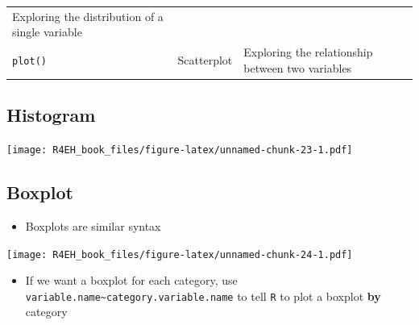 \documentclass[]{book}
\newenvironment{Shaded}{\begin{snugshade}}{\end{snugshade}}
\newcommand{\KeywordTok}[1]{\textcolor[rgb]{0.13,0.29,0.53}{\textbf{#1}}}
\newcommand{\StringTok}[1]{\textcolor[rgb]{0.31,0.60,0.02}{#1}}
\newcommand{\OperatorTok}[1]{\textcolor[rgb]{0.81,0.36,0.00}{\textbf{#1}}}
\newcommand{\NormalTok}[1]{#1}
\providecommand{\tightlist}{%
  \setlength{\itemsep}{0pt}\setlength{\parskip}{0pt}}
\theoremstyle{definition}
\theoremstyle{definition}
\theoremstyle{definition}
\theoremstyle{remark}
\begin{document}
\begin{longtable}[]{@{}lll@{}}
\begin{minipage}[t]{0.63\columnwidth}
Exploring the distribution of a single variable\strut
\end{minipage}\tabularnewline
\begin{minipage}[t]{0.14\columnwidth}\raggedright\strut
\texttt{plot()}\strut
\end{minipage} & \begin{minipage}[t]{0.14\columnwidth}\raggedright\strut
Scatterplot\strut
\end{minipage} & \begin{minipage}[t]{0.63\columnwidth}\raggedright\strut
Exploring the relationship between two variables\strut
\end{minipage}\tabularnewline
\bottomrule
\end{longtable}

\subsection{Histogram}\label{histogram}

\begin{Shaded}
\end{Shaded}

\texttt{[image: R4EH\_book\_files/figure-latex/unnamed-chunk-23-1.pdf]}

\subsection{Boxplot}\label{boxplot}

\begin{itemize}
\tightlist
\item
  Boxplots are similar syntax
\end{itemize}

\begin{Shaded}
\end{Shaded}

\texttt{[image: R4EH\_book\_files/figure-latex/unnamed-chunk-24-1.pdf]}

\begin{itemize}
\tightlist
\item
  If we want a boxplot for each category, use
  \texttt{variable.name\textasciitilde{}category.variable.name} to tell
  \texttt{R} to plot a boxplot \textbf{by} category
\end{itemize}
\end{document}
